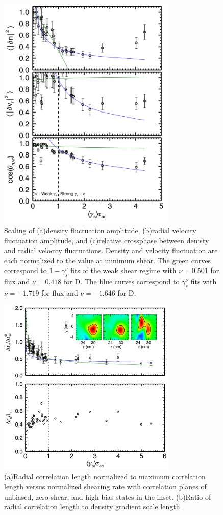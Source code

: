 \documentclass[aip,pop,amsmath,amssymb,reprint,superscriptaddress]{revtex4-1} %
\begin{document}
\begin{figure}[!htbp]
\centerline{
\includegraphics[width=8.5cm]{densvrcp}}
\caption{\label{fig:densvrcp} Scaling of (a)density fluctuation amplitude, (b)radial velocity fluctuation amplitude, and (c)relative crossphase between denisty and radial velocity fluctuations. Density and velocity fluctuation are each normalized to the value at minimum shear. The green curves correspond to $1-\gamma_{s}^{\nu}$ fits of the weak shear regime with $\nu = 0.501$ for flux and $\nu = 0.418$ for D. The blue curves correspond to $\gamma_{s}^{\nu}$ fits with $\nu = -1.719$ for flux and $\nu = -1.646$ for D.}
\end{figure}

\begin{figure}[!htbp]
\centerline{
\includegraphics[width=8.5cm]{RadCorrLn}}
\caption{\label{fig:densvrcp} (a)Radial correlation length normalized to maximum correlation length versus normalized shearing rate with correlation planes of unbiased, zero shear, and high bias states in the inset. (b)Ratio of radial correlation length to density gradient scale length.}
\end{figure}
\end{document}
